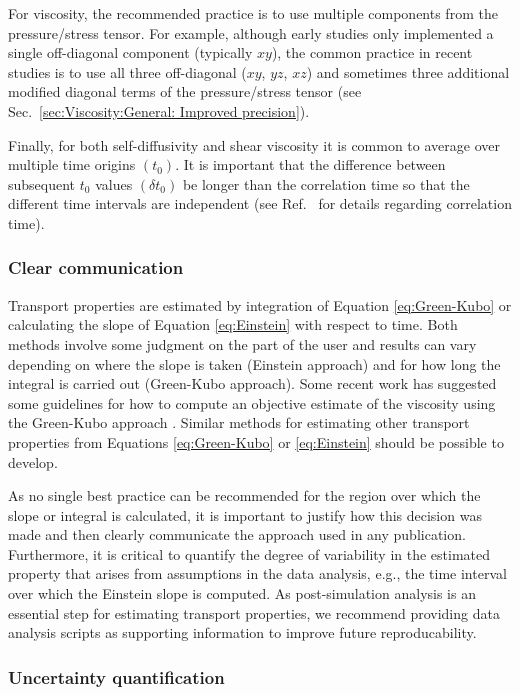 \documentclass[9pt,bestpractices]{livecoms}
\begin{document}
For viscosity, the recommended practice is to use multiple components from the pressure/stress tensor. For example, although early studies only implemented a single off-diagonal component (typically $xy$), the common practice in recent studies is to use all three off-diagonal ($xy$, $yz$, $xz$) and sometimes three additional modified diagonal terms of the pressure/stress tensor (see Sec.\ \ref{sec:Viscosity:General: Improved precision}).

Finally, for both self-diffusivity and shear viscosity it is common to average over multiple time origins $(t_0)$. It is important that the difference between subsequent $t_0$ values $(\delta t_0)$ be longer than the correlation time so that the different time intervals are independent (see Ref.\ \cite{Grossfield2018} for details regarding correlation time).

\subsubsection{Clear communication} \label{sec:General: Clear communication}

Transport properties are estimated by integration of Equation \ref{eq:Green-Kubo} or calculating the slope of Equation \ref{eq:Einstein} with respect to time. Both methods involve some judgment on the part of the user and results can vary depending on where the slope is taken (Einstein approach) and for how long the integral is carried out (Green-Kubo approach). Some recent work has suggested some guidelines for how to compute an objective estimate of the viscosity using the Green-Kubo approach \cite{Zhang2015}. Similar methods for estimating other transport properties from Equations \ref{eq:Green-Kubo} or \ref{eq:Einstein} should be possible to develop. 

As no single best practice can be recommended for the region over which the slope or integral is calculated, it is important to justify how this decision was made and then clearly communicate the approach used in any publication. Furthermore, it is critical to quantify the degree of variability in the estimated property that arises from assumptions in the data analysis, e.g., the time interval over which the Einstein slope is computed. As post-simulation analysis is an essential step for estimating transport properties, we recommend providing data analysis scripts as supporting information to improve future reproducability.

\subsubsection{Uncertainty quantification} \label{sec:General: Uncertainty}
\end{document}
